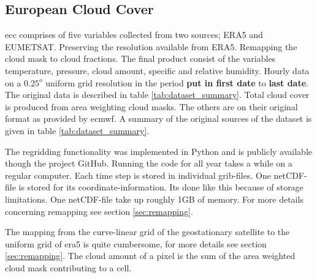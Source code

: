 \subsection{European Cloud Cover} \label{sec:ecc}
\acrfull{ecc} comprises of five variables collected from two sources; ERA5 and EUMETSAT. Preserving the resolution available from ERA5. Remapping the cloud mask to cloud fractions. The final product consist of the variables temperature, pressure, cloud amount, specific and relative humidity. Hourly data on a $0.25^o$ uniform grid  resolution in the period \textbf{put in first date} to \textbf{last date}. The original data is described in table \ref{tab:dataset_summary}. Total cloud cover is produced from area weighting cloud masks. The others are on their original format as provided by \acrfull{ecmwf}. A summary of the original sources of the dataset is given in table \ref{tab:dataset_summary}.

The regridding functionality was implemented in Python and is publicly available though the project GitHub. Running the code for all year takes a while on a regular computer. Each time step is stored in individual grib-files. One netCDF-file is stored for its coordinate-information. Its done like this because of storage limitations. One netCDF-file take up roughly 1GB of memory. For more details concerning remapping see section \ref{sec:remapping}. 

The mapping from the curve-linear grid of the geostationary satellite to the uniform grid of era5 is quite cumbersome, for more details see section \ref{sec:remapping}. The cloud amount of a pixel is the sum of the area weighted cloud mask contributing to a cell.


